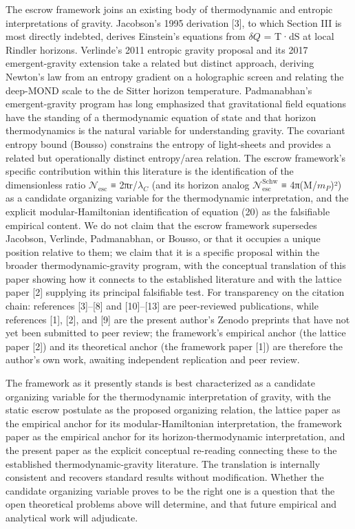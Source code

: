 \documentclass[11pt]{article}
\begin{document}
The escrow framework joins an existing body of thermodynamic and
entropic interpretations of gravity. Jacobson's 1995 derivation [3],
to which Section III is most directly indebted, derives Einstein's
equations from $\delta Q$ = T·dS at local Rindler horizons. Verlinde's 2011
entropic gravity proposal and its 2017 emergent-gravity extension take a
related but distinct approach, deriving Newton's law from an entropy
gradient on a holographic screen and relating the deep-MOND scale to the
de Sitter horizon temperature. Padmanabhan's emergent-gravity program
has long emphasized that gravitational field equations have the standing
of a thermodynamic equation of state and that horizon thermodynamics is
the natural variable for understanding gravity. The covariant entropy
bound (Bousso) constrains the entropy of light-sheets and provides a
related but operationally distinct entropy/area relation. The escrow
framework's specific contribution within this literature is the
identification of the dimensionless ratio $\mathcal{N}_{\mathrm{esc}}$ ≡ 2πr/$\lambda_{C}$ (and its
horizon analog $\mathcal{N}_{\mathrm{esc}}^{\mathrm{Schw}}$ ≡ 4π(M/$m_{P}$)²) as a candidate organizing
variable for the thermodynamic interpretation, and the explicit
modular-Hamiltonian identification of equation (20) as the falsifiable
empirical content. We do not claim that the escrow framework supersedes
Jacobson, Verlinde, Padmanabhan, or Bousso, or that it occupies a unique
position relative to them; we claim that it is a specific proposal
within the broader thermodynamic-gravity program, with the conceptual
translation of this paper showing how it connects to the established
literature and with the lattice paper [2] supplying its principal
falsifiable test. For transparency on the citation chain: references
[3]--[8] and [10]--[13] are peer-reviewed publications, while
references [1], [2], and [9] are the present author's Zenodo
preprints that have not yet been submitted to peer review; the
framework's empirical anchor (the lattice paper [2]) and its
theoretical anchor (the framework paper [1]) are therefore the
author's own work, awaiting independent replication and peer review.

The framework as it presently stands is best characterized as a
candidate organizing variable for the thermodynamic interpretation of
gravity, with the static escrow postulate as the proposed organizing
relation, the lattice paper as the empirical anchor for its
modular-Hamiltonian interpretation, the framework paper as the empirical
anchor for its horizon-thermodynamic interpretation, and the present
paper as the explicit conceptual re-reading connecting these to the
established thermodynamic-gravity literature. The translation is
internally consistent and recovers standard results without
modification. Whether the candidate organizing variable proves to be the
right one is a question that the open theoretical problems above will
determine, and that future empirical and analytical work will
adjudicate.
\end{document}
